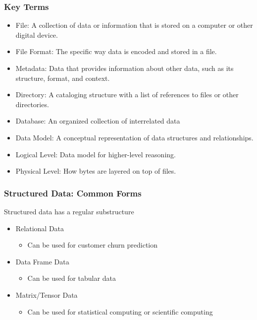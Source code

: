 \documentclass[12pt]{article}
\begin{document}
\subsubsection{Key Terms}
\begin{itemize}
    \item File: A collection of data or information that is stored on a computer or other digital device.
    \item File Format: The specific way data is encoded and stored in a file.
    \item Metadata: Data that provides information about other data, such as its structure, format, and context.
    \item Directory: A cataloging structure with a list of references to files or other directories.
    \item Database: An organized collection of interrelated data
    \item Data Model: A conceptual representation of data structures and relationships.
    \item Logical Level: Data model for higher-level reasoning.
    \item Physical Level: How bytes are layered on top of files.
\end{itemize}

\subsubsection{Structured Data: Common Forms}
\begin{tcolorbox}[colback=green!5!white,colframe=green!75!black,title={Structured Data}]
    Structured data has a regular substructure
\end{tcolorbox}
\begin{itemize}
    \item Relational Data
    \begin{itemize}
        \item Can be used for customer churn prediction
    \end{itemize}

    \item Data Frame Data
    \begin{itemize}
        \item Can be used for tabular data
    \end{itemize}

    \item Matrix/Tensor Data
    \begin{itemize}
        \item Can be used for statistical computing or scientific computing
    \end{itemize}
\end{itemize}
\end{document}
